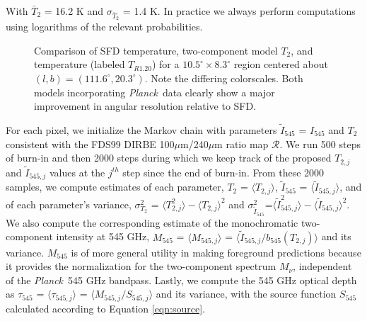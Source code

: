 \documentclass{emulateapj}
\newcommand{\PLANCK}{{\it Planck}}
\begin{document}

With $\bar{T}_2$ = 16.2 K and $\sigma_{\bar{T}_2}$ = 1.4 K. In practice we 
always perform computations using logarithms of the relevant probabilities.

\begin{figure}
\begin{center}
\caption{\label{fig:comparison} Comparison of SFD temperature, two-component 
model $T_2$, and \cite{planckdust} temperature (labeled $T_{R1.20}$) for a
 $10.5^{\circ}\times8.3^{\circ}$  region centered about 
$(l,b) = (111.6^{\circ}, 20.3^{\circ})$. Note the differing colorscales. Both 
models incorporating \PLANCK~data clearly show a major improvement in angular 
resolution relative to SFD.}
\end{center}
\end{figure}

For each pixel, we initialize the Markov chain with parameters 
$\tilde{I}_{545}$ = $I_{545}$ and $T_2$ consistent with the FDS99 
DIRBE 100$\mu$m/240$\mu$m ratio map $\mathscr{R}$. We run 500 steps of burn-in 
and then 2000 steps during which we keep track of the proposed $T_{2, j}$ and 
$\tilde{I}_{545, j}$ values at the $j^{th}$ step since the end of burn-in. From
 these 2000 samples, we compute estimates of each parameter, 
$T_2$ = $\langle T_{2, j} \rangle$, $\tilde{I}_{545}$ = 
$\langle \tilde{I}_{545, j} \rangle$, and of each parameter's variance, 
$\sigma^2_{T_2}$ = $\langle T^2_{2, j} \rangle-\langle T_{2, j} \rangle ^2$ and
 $\sigma^2_{\tilde{I}_{545}}$=$\langle \tilde{I}^2_{545, j} 
\rangle-\langle \tilde{I}_{545, j} \rangle ^2$. We also compute the
 corresponding estimate of the monochromatic two-component intensity at 545 
GHz, $M_{545}$ = $\langle M_{545, j} \rangle$ = 
$\langle \tilde{I}_{545, j}/b_{545}(T_{2,j}) \rangle$  and its variance. 
$M_{545}$ is of more general utility in making foreground predictions because 
it provides the normalization for the two-component spectrum $M_{\nu}$, 
independent of the \PLANCK~545 GHz bandpass. Lastly, we compute the 545 GHz
optical depth as $\tau_{545}$ = $\langle \tau_{545, j} \rangle$ = 
$\langle M_{545, j}/S_{545, j} \rangle$ and its variance, with the source 
function $S_{545}$ calculated according to Equation \ref{eqn:source}.

\end{document}
